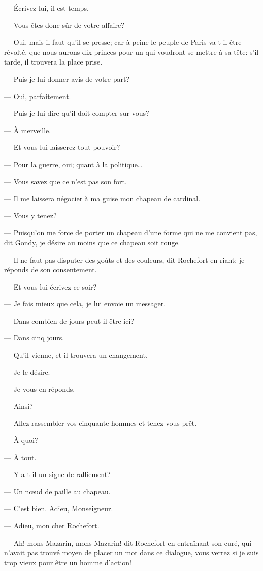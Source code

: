 — Écrivez-lui, il est temps.

— Vous êtes donc sûr de votre affaire?

— Oui, mais il faut qu'il se presse; car à peine le peuple de Paris va-t-il être révolté, que nous aurons dix princes pour un qui voudront se mettre à sa tête: s'il tarde, il trouvera la place prise.

— Puis-je lui donner avis de votre part?

— Oui, parfaitement.

— Puis-je lui dire qu'il doit compter sur vous?

— À merveille.

— Et vous lui laisserez tout pouvoir?

— Pour la guerre, oui; quant à la politique\dots

— Vous savez que ce n'est pas son fort.

— Il me laissera négocier à ma guise mon chapeau de cardinal.

— Vous y tenez?

— Puisqu'on me force de porter un chapeau d'une forme qui ne me convient pas, dit Gondy, je désire au moins que ce chapeau soit rouge.

— Il ne faut pas disputer des goûts et des couleurs, dit Rochefort en riant; je réponds de son consentement.

— Et vous lui écrivez ce soir?

— Je fais mieux que cela, je lui envoie un messager.

— Dans combien de jours peut-il être ici?

— Dans cinq jours.

— Qu'il vienne, et il trouvera un changement.

— Je le désire.

— Je vous en réponds.

— Ainsi?

— Allez rassembler vos cinquante hommes et tenez-vous prêt.

— À quoi?

— À tout.

— Y a-t-il un signe de ralliement?

— Un nœud de paille au chapeau.

— C'est bien. Adieu, Monseigneur.

— Adieu, mon cher Rochefort.

— Ah! mons Mazarin, mons Mazarin! dit Rochefort en entraînant son curé, qui n'avait pas trouvé moyen de placer un mot dans ce dialogue, vous verrez si je suis trop vieux pour être un homme d'action!

